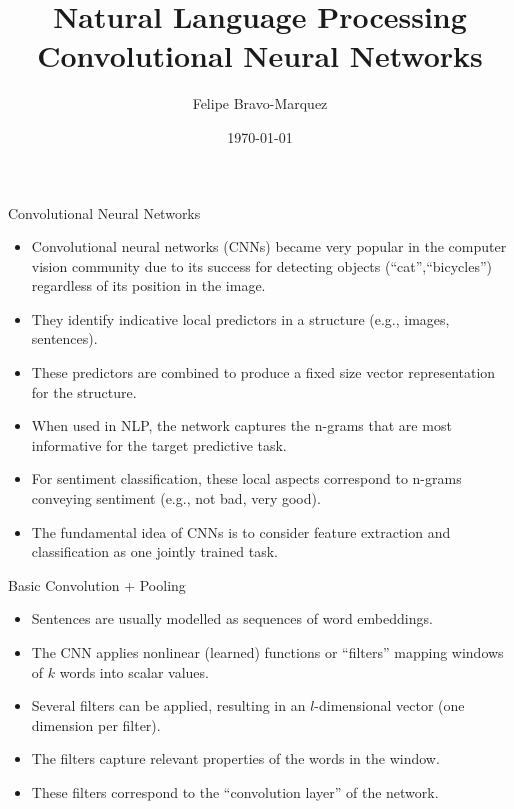 \documentclass[handout]{beamer}
\title{Natural Language Processing \\ Convolutional Neural Networks}
\author[Felipe Bravo Márquez]{\footnotesize
 \textcolor[rgb]{0.00,0.00,1.00}{Felipe Bravo-Marquez}}
\date{\today}
\begin{document}
\begin{frame}
\titlepage


\end{frame}



\begin{frame}{Convolutional Neural Networks}
\begin{scriptsize}
\begin{itemize}
\item Convolutional neural networks (CNNs) became very popular in the computer vision community due to its success for detecting objects (``cat'',``bicycles'') regardless of its position in the image.
\item They identify indicative local predictors in a structure (e.g., images, sentences).
\item These predictors are combined to produce a fixed size vector representation for the structure.
\item When used in NLP, the network captures the n-grams that are most informative for the target predictive task.
\item For sentiment classification, these local aspects correspond to n-grams conveying sentiment (e.g., not bad, very good).
\item The fundamental idea of CNNs \cite{lecun1998gradient}  is  to  consider  feature extraction and classification as one jointly trained task. 

\end{itemize}
\end{scriptsize}
\end{frame}

\begin{frame}{Basic Convolution  + Pooling}
\begin{scriptsize}
\begin{itemize}
\item Sentences are usually modelled as sequences of word embeddings.
\item The CNN applies  nonlinear (learned) functions or ``filters'' mapping windows of $k$ words into scalar values.
\item Several filters can be applied, resulting in an $l$-dimensional vector (one dimension per filter).
\item The filters capture relevant properties of the words in the window.
\item These filters correspond to the ``convolution layer'' of the network.
\end{itemize}
\end{scriptsize}
\end{frame}
\end{document}
